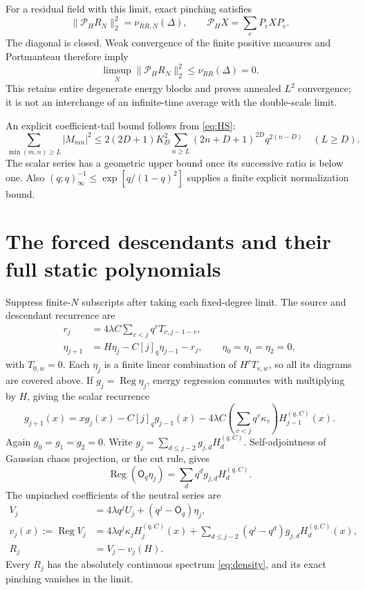 \documentclass[11pt]{article}
\newcommand{\OO}{\mathsf O_q}
\newcommand{\HH}{H^{(q,C)}}
\newcommand{\Reg}{\operatorname{Reg}}
\begin{document}
For a residual field with this limit, exact pinching satisfies
\begin{equation}
 \|\mathcal P_HR_N\|_2^2=\nu_{RR,N}(\Delta),\qquad
 \mathcal P_HX=\sum_eP_eXP_e.
\end{equation}
The diagonal is closed. Weak convergence of the finite positive
measures and Portmanteau therefore imply
\begin{equation}
 \limsup_N\|\mathcal P_HR_N\|_2^2
 \le\nu_{RR}(\Delta)=0.\label{eq:pinching}
\end{equation}
This retains entire degenerate energy blocks and proves annealed
$L^2$ convergence; it is not an interchange of an infinite-time
average with the double-scale limit.

An explicit coefficient-tail bound follows from \eqref{eq:HS}:
\begin{equation}
 \sum_{\min(m,n)\ge L}|M_{mn}|^2
 \le2(2D+1)K_D^2\sum_{n\ge L}(2n+D+1)^{2D}q^{2(n-D)}
 \quad(L\ge D).
\end{equation}
The scalar series has a geometric upper bound once its successive
ratio is below one. Also $(q;q)_\infty^{-1}\le
\exp[q/(1-q)^2]$ supplies a finite explicit normalization bound.

\newpage
\section{The forced descendants and their full static polynomials}
Suppress finite-$N$ subscripts after taking each fixed-degree limit.
The source and descendant recurrence are
\begin{align}
 r_j&=4\lambda C\sum_{v<j}q^vT_{v,j-1-v},\\
 \eta_{j+1}&=H\eta_j-C[j]_q\eta_{j-1}-r_j,
 \qquad \eta_0=\eta_1=\eta_2=0,
\end{align}
with $T_{0,w}=0$. Each $\eta_j$ is a finite linear combination of
$H^rT_{v,w}$, so all its diagrams are covered above.
If $g_j=\Reg\eta_j$, energy regression commutes with multiplying
by $H$, giving the scalar recurrence
\begin{equation}
 \boxed{g_{j+1}(x)=xg_j(x)-C[j]_qg_{j-1}(x)
 -4\lambda C\left(\sum_{v<j}q^v\kappa_v\right)\HH_{j-1}(x).}
 \label{eq:g}
\end{equation}
Again $g_0=g_1=g_2=0$. Write
$g_j=\sum_{d\le j-2}g_{j,d}\HH_d$. Self-adjointness of Gaussian
chaos projection, or the cut rule, gives
\begin{equation}
 \Reg(\OO\eta_j)=\sum_dq^dg_{j,d}\HH_d.
\end{equation}
The unpinched coefficients of the neutral series are
\begin{align}
 V_j&=4\lambda q^jU_j+(q^j-\OO)\eta_j,\\
 v_j(x):=\Reg V_j
 &=4\lambda q^j\kappa_j\HH_j(x)
    +\sum_{d\le j-2}(q^j-q^d)g_{j,d}\HH_d(x),\label{eq:v}\\
 R_j&=V_j-v_j(H).
\end{align}
Every $R_j$ has the absolutely continuous spectrum
\eqref{eq:density}, and its exact pinching vanishes in the limit.
\end{document}
